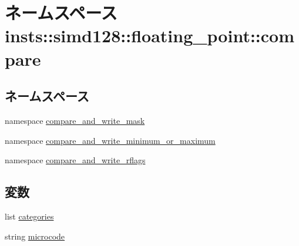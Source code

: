 \hypertarget{namespaceinsts_1_1simd128_1_1floating__point_1_1compare}{
\section{ネームスペース insts::simd128::floating\_\-point::compare}
\label{namespaceinsts_1_1simd128_1_1floating__point_1_1compare}
}
\subsection*{ネームスペース}
\begin{DoxyCompactItemize}
\item 
namespace \hyperlink{namespaceinsts_1_1simd128_1_1floating__point_1_1compare_1_1compare__and__write__mask}{compare\_\-and\_\-write\_\-mask}
\item 
namespace \hyperlink{namespaceinsts_1_1simd128_1_1floating__point_1_1compare_1_1compare__and__write__minimum__or__maximum}{compare\_\-and\_\-write\_\-minimum\_\-or\_\-maximum}
\item 
namespace \hyperlink{namespaceinsts_1_1simd128_1_1floating__point_1_1compare_1_1compare__and__write__rflags}{compare\_\-and\_\-write\_\-rflags}
\end{DoxyCompactItemize}
\subsection*{変数}
\begin{DoxyCompactItemize}
\item 
list \hyperlink{namespaceinsts_1_1simd128_1_1floating__point_1_1compare_a273cf0f1630af14c1582f05e53354a55}{categories}
\item 
string \hyperlink{namespaceinsts_1_1simd128_1_1floating__point_1_1compare_a770f11a173e99389a8802f0107ed8f52}{microcode}
\end{DoxyCompactItemize}


